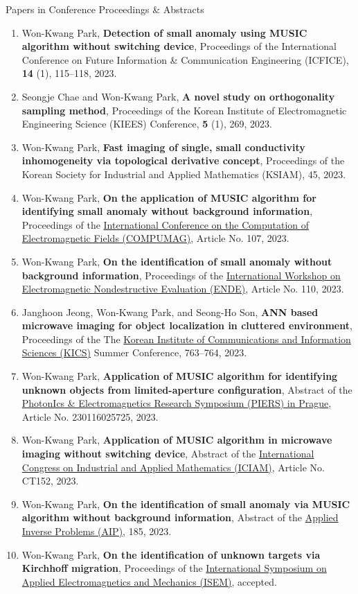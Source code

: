 \documentclass{resume} %
\begin{document}
\begin{rSection}{Papers in Conference Proceedings \& Abstracts}
\begin{enumerate}
\item\label{C-ICFICE2023} Won-Kwang Park, \textbf{Detection of small anomaly using MUSIC algorithm without switching device}, Proceedings of the  International Conference on Future Information \& Communication Engineering (ICFICE), \textbf{14} (1), 115--118, 2023.
\item\label{C-KIEES2023} Seongje Chae and Won-Kwang Park, \textbf{A novel study on orthogonality sampling method}, Proceedings of the Korean Institute of Electromagnetic Engineering Science (KIEES) Conference, \textbf{5} (1), 269, 2023.
\item\label{C-KSIAM2023} Won-Kwang Park, \textbf{Fast imaging of single, small conductivity inhomogeneity via topological derivative concept}, Proceedings of the Korean Society for Industrial and Applied Mathematics (KSIAM), 45, 2023.
\item\label{C-COMPUMAG2023} Won-Kwang Park, \textbf{On the application of MUSIC algorithm for identifying small anomaly without background information}, Proceedings of the \href{https://www.compumag2023.com/}{ International Conference on the Computation of Electromagnetic Fields (COMPUMAG)}, Article No. 107, 2023.
\item\label{C-ENDE2023} Won-Kwang Park, \textbf{On the identification of small anomaly without background information}, Proceedings of the \href{https://www.ende2023.gr}{ International Workshop on Electromagnetic Nondestructive Evaluation (ENDE)}, Article No. 110, 2023.
\item\label{C-KICS2023} Janghoon Jeong, Won-Kwang Park, and Seong-Ho Son, \textbf{ANN based microwave imaging for object localization in cluttered environment}, Proceedings of the The \href{https://eng.kics.or.kr/html/?pmode=english}{Korean Institute of Communications and Information Sciences (KICS)} Summer Conference, 763--764, 2023.
\item\label{C-PIERS2023} Won-Kwang Park, \textbf{Application of MUSIC algorithm for identifying unknown objects from limited-aperture configuration}, Abstract of the \href{https://prague2023.piers.org}{PhotonIcs \& Electromagnetics Research Symposium (PIERS) in Prague}, Article No. 230116025725, 2023.
\item\label{C-ICIAM2023} Won-Kwang Park, \textbf{Application of MUSIC algorithm in microwave imaging without switching device}, Abstract of the \href{https://iciam2023.org}{ International Congress on Industrial and Applied Mathematics (ICIAM)}, Article No. CT152, 2023.
\item\label{C-AIP2023} Won-Kwang Park, \textbf{On the identification of small anomaly via MUSIC algorithm without background information}, Abstract of the \href{http://www.aip2023.de}{Applied Inverse Problems (AIP)}, 185, 2023.
\item\label{C-ISEM2023} Won-Kwang Park, \textbf{On the identification of unknown targets via Kirchhoff migration}, Proceedings of the \href{https://www.isem2023.org}{ International Symposium on Applied Electromagnetics and Mechanics (ISEM)}, accepted.
\end{enumerate}
\end{rSection}
\end{document}
